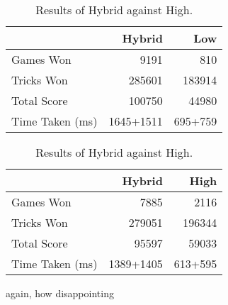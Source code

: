 \begin{table}[ht]
    \begin{minipage}{.5\linewidth}
        \centering
        \begin{tabular}{l|rr}
            ~               &  Hybrid &   Low  \\  \hline
            Games Won       &   9191        &   810   \\
            Tricks Won      &   285601      &   183914 \\
            Total Score     &   100750      &   44980  \\
            Time Taken (ms) &   1645+1511   &   695+759
        \end{tabular}
        \caption{Results of Hybrid against Low.}
        \label{tab:hybrid_low}
    \end{minipage}%
    \begin{minipage}{.5\linewidth}
        \centering
        \begin{tabular}{l|rr}
            ~               &  Hybrid &   High  \\  \hline
            Games Won       &   7885        &   2116   \\
            Tricks Won      &   279051      &   196344 \\
            Total Score     &   95597      &   59033  \\
            Time Taken (ms) &   1389+1405   &   613+595
        \end{tabular}
        \caption{Results of Hybrid against High.}
        \label{tab:hybrid_high}
    \end{minipage} 
\end{table}



again, how disappointing


